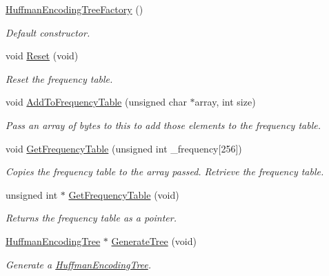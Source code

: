 \begin{DoxyCompactItemize}
\item 
\hypertarget{class_rak_net_1_1_huffman_encoding_tree_factory_a1653ab2de9f12d5016b78eff1e01c57a}{\hyperlink{class_rak_net_1_1_huffman_encoding_tree_factory_a1653ab2de9f12d5016b78eff1e01c57a}{Huffman\-Encoding\-Tree\-Factory} ()}\label{class_rak_net_1_1_huffman_encoding_tree_factory_a1653ab2de9f12d5016b78eff1e01c57a}

\begin{DoxyCompactList}\small\item\em Default constructor. \end{DoxyCompactList}\item 
void \hyperlink{class_rak_net_1_1_huffman_encoding_tree_factory_a37d4d51372e6fa4533edd536ce148b0a}{Reset} (void)
\begin{DoxyCompactList}\small\item\em Reset the frequency table. \end{DoxyCompactList}\item 
void \hyperlink{class_rak_net_1_1_huffman_encoding_tree_factory_a8a030e488032340006ac5587c01ad846}{Add\-To\-Frequency\-Table} (unsigned char $\ast$array, int size)
\begin{DoxyCompactList}\small\item\em Pass an array of bytes to this to add those elements to the frequency table. \end{DoxyCompactList}\item 
void \hyperlink{class_rak_net_1_1_huffman_encoding_tree_factory_a73e99fa4d2e3adbb0c6f214e1c16ff4e}{Get\-Frequency\-Table} (unsigned int \-\_\-frequency\mbox{[}256\mbox{]})
\begin{DoxyCompactList}\small\item\em Copies the frequency table to the array passed. Retrieve the frequency table. \end{DoxyCompactList}\item 
unsigned int $\ast$ \hyperlink{class_rak_net_1_1_huffman_encoding_tree_factory_aa0b6723d43859de6adf598771b19d312}{Get\-Frequency\-Table} (void)
\begin{DoxyCompactList}\small\item\em Returns the frequency table as a pointer. \end{DoxyCompactList}\item 
\hyperlink{class_rak_net_1_1_huffman_encoding_tree}{Huffman\-Encoding\-Tree} $\ast$ \hyperlink{class_rak_net_1_1_huffman_encoding_tree_factory_a95784ea75a396e9a6313744c4020381d}{Generate\-Tree} (void)
\begin{DoxyCompactList}\small\item\em Generate a \hyperlink{class_rak_net_1_1_huffman_encoding_tree}{Huffman\-Encoding\-Tree}. \end{DoxyCompactList}\end{DoxyCompactItemize}


